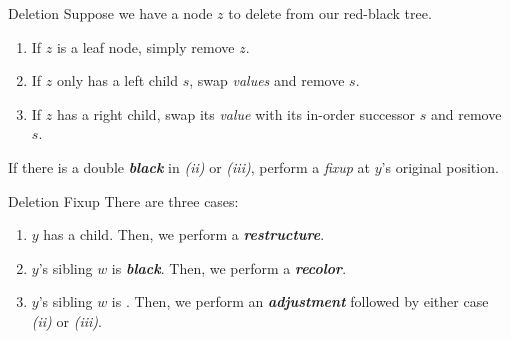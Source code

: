 \documentclass[aspectratio=169]{beamer}
\newcommand{\textib}[1]{\textit{\textbf{{#1}}}}
\newcommand{\red}{\textib{\color{red}{red }}}
\begin{document}
\begin{frame}{Deletion}
    Suppose we have a node $z$ to delete from our red-black tree.
    \newline
    \begin{enumerate}[label=\textit{(\roman*)}]
        \item If $z$ is a \red leaf node, simply remove $z$.
        \item If $z$ only has a left child $s$, swap \textit{values} and remove $s$.
        \item If $z$ has a right child, swap its \textit{value} with its in-order successor $s$ and 
            remove $s$. 
    \end{enumerate}
    \hfil
    \newline
    If there is a double \textib{black} in \textit{(ii)} or \textit{(iii)}, perform a 
    \textit{fixup} at $y$'s original position.
\end{frame}

\begin{frame}{Deletion Fixup}
    There are three cases:
    \begin{enumerate}[label=\textit{(\roman*)}]
        \item $y$ has a \red child. Then, we perform a \textib{restructure}.
        \item $y$'s sibling $w$ is \textib{black}. Then, we perform a \textib{recolor}.
        \item $y$'s sibling $w$ is \red. Then, we perform an \textib{adjustment} followed by 
            either case \textit{(ii)} or \textit{(iii)}.
    \end{enumerate}
\end{frame}
\end{document}
